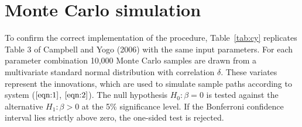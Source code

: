\documentclass{article}
\begin{document}
\section{Monte Carlo simulation}

To confirm the correct implementation of the procedure, Table~\vref{tab:cy} replicates Table 3 of Campbell and Yogo (2006) with the same input parameters. For each parameter combination 10,000 Monte Carlo samples are drawn from a multivariate standard normal distribution with correlation $\delta$. These variates represent the innovations, which are used to simulate sample paths according to system ($\ref{eqn:1}$, $\ref{eqn:2}$). The null hypothesis $H_0: \beta = 0$ is tested against the alternative $H_1: \beta > 0$ at the 5\% significance level. If the Bonferroni confidence interval lies strictly above zero, the one-sided test is rejected. 
\end{document}
